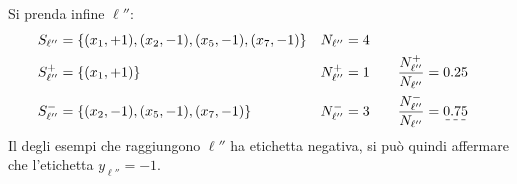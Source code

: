 Si prenda infine $\ell''$:
$$
\begin{aligned}
    &S_{\ell''} = \{ (x_1,+1),(x_2,-1),(x_5,-1),(x_7,-1) \} & N_{\ell''}=4 \\
    &S_{\ell''}^+ = \{ (x_1,+1) \} & \NlposTwo=1 & \qquad \frac{\NlposTwo}{N_{\ell''}}=0.25 \\
    &S_{\ell''}^- = \{ (x_2,-1),(x_5,-1),(x_7,-1) \} & \NlnegTwo=3 
        & \qquad \frac{\NlnegTwo}{N_{\ell''}}=\dashuline{0.75} \\
\end{aligned}
$$
Il  degli esempi che raggiungono $\ell''$ ha etichetta negativa, si può quindi
affermare che l'etichetta $y_{\ell''}=-1$.